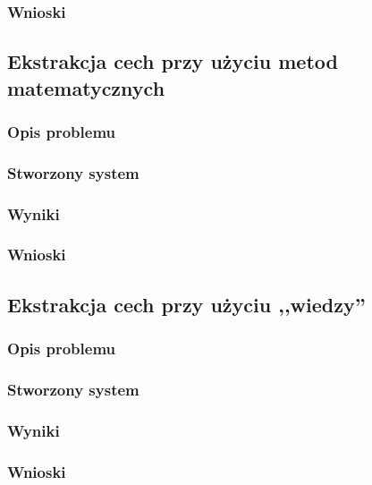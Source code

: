 \subsubsection{Wnioski}

\subsection{Ekstrakcja cech przy użyciu metod matematycznych}
\subsubsection{Opis problemu}
\subsubsection{Stworzony system}
\subsubsection{Wyniki}
\subsubsection{Wnioski}

\subsection{Ekstrakcja cech przy użyciu ,,wiedzy''}
\subsubsection{Opis problemu}
\subsubsection{Stworzony system}
\subsubsection{Wyniki}
\subsubsection{Wnioski}

